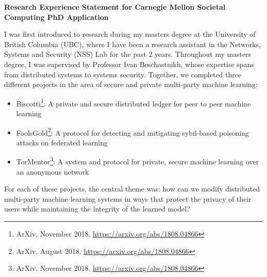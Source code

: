 \documentclass[10pt]{article} %
\begin{document}
\begin{center}
{\large \bf Research Experience Statement for Carnegie Mellon Societal Computing PhD Application}
\end{center}

I was first introduced to research during my masters degree at the University of British Columbia (UBC), where I have been a research assistant in the Networks, Systems and Security (NSS) Lab for the past 2 years. Throughout my masters degree, I was supervised by Professor Ivan Beschastnikh, whose expertise spans from distributed systems to systems security. Together, we completed three different projects in the area of secure and private multi-party machine learning:
\begin{itemize}
\item Biscotti\footnote{ArXiv, November 2018. \url{https://arxiv.org/abs/1808.04866}}: A private and secure distributed ledger for peer to peer machine learning
\item FoolsGold\footnote{ArXiv, August 2018. \url{https://arxiv.org/abs/1808.04866}}: A protocol for detecting and mitigating sybil-based poisoning attacks on federated learning
\item TorMentor\footnote{ArXiv, November 2018. \url{https://arxiv.org/abs/1808.04866}}: A system and protocol for private, secure machine learning over an anonymous network
\end{itemize}

For each of these projects, the central theme was: how can we modify distributed multi-party machine learning systems in ways that protect the privacy of their users while maintaining the integrity of the learned model? \\
\end{document}
